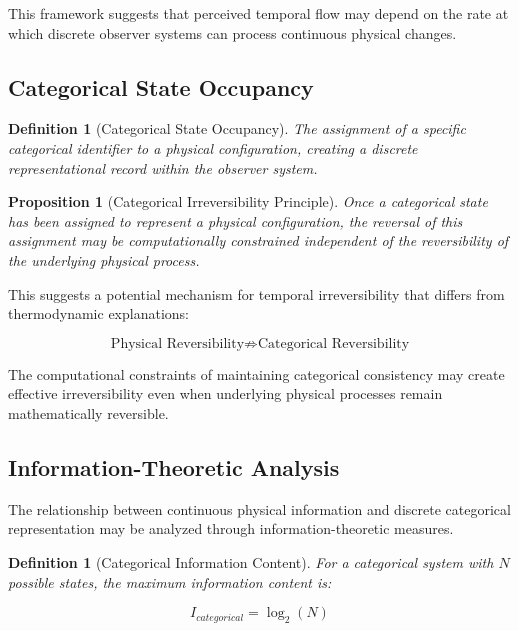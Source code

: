 \documentclass[12pt,a4paper]{article}
\newtheorem{definition}[theorem]{Definition}
\newtheorem{proposition}[theorem]{Proposition}
\theoremstyle{remark}
\begin{document}
This framework suggests that perceived temporal flow may depend on the rate at which discrete observer systems can process continuous physical changes.

\subsection{Categorical State Occupancy}

\begin{definition}[Categorical State Occupancy]
The assignment of a specific categorical identifier to a physical configuration, creating a discrete representational record within the observer system.
\end{definition}

\begin{proposition}[Categorical Irreversibility Principle]
Once a categorical state has been assigned to represent a physical configuration, the reversal of this assignment may be computationally constrained independent of the reversibility of the underlying physical process.
\end{proposition}

This suggests a potential mechanism for temporal irreversibility that differs from thermodynamic explanations:

\begin{equation}
\text{Physical Reversibility} \not\Rightarrow \text{Categorical Reversibility}
\end{equation}

The computational constraints of maintaining categorical consistency may create effective irreversibility even when underlying physical processes remain mathematically reversible.

\subsection{Information-Theoretic Analysis}

The relationship between continuous physical information and discrete categorical representation may be analyzed through information-theoretic measures.

\begin{definition}[Categorical Information Content]
For a categorical system with $N$ possible states, the maximum information content is:

\begin{equation}
I_{categorical} = \log_2(N)
\end{equation}
\end{definition}
\end{document}
